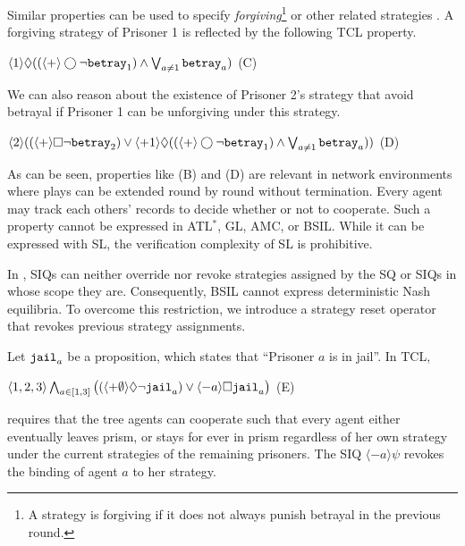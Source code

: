 \documentclass{llncs}
\newcommand{\pfrr}{\Box}
\newcommand{\pevt}{\Diamond}
\newcommand{\nxt}{\bigcirc}
\begin{document}
Similar properties can be used to specify {\em forgiving}\footnote{A strategy 
is forgiving if it does not always punish betrayal in the previous round.} 
or other related strategies \cite{Axelrod80}.  
A forgiving strategy of Prisoner 1 
is reflected by the following TCL property. 
\begin{center} 
\hfill 
$\langle 1\rangle \pevt ((\langle+\rangle \nxt \neg\mbox{\tt betray}_1)
\wedge \bigvee_{a\neq 1}\mbox{\tt betray}_a)$
\hfill (C) 
\end{center} 
We can also reason about the existence of Prisoner 2's strategy 
that avoid betrayal if Prisoner 1 can be unforgiving under this strategy. 
\begin{center} 
\hfill 
$\langle 2\rangle (
(\langle+\rangle \pfrr \neg\mbox{\tt betray}_2) 
\vee \langle +1\rangle\pevt ((\langle+\rangle \nxt \neg\mbox{\tt betray}_1)
\wedge \bigvee_{a\neq 1}\mbox{\tt betray}_a))$
\hfill (D) 
\end{center} 
As can be seen, properties like (B) and (D) are relevant in network environments
where plays can be extended round by round
without termination.  
Every agent may track each others' records to decide whether or not to cooperate. 
Such a property cannot be expressed in ATL$^*$, GL, AMC, or BSIL. 
While it can be expressed with SL, the verification complexity of SL is prohibitive.  

In \cite{WHY11}, SIQs can neither override nor revoke strategies assigned by the SQ or SIQs in whose scope they are.
Consequently, BSIL cannot express deterministic Nash equilibria.
To overcome this restriction, we introduce a strategy reset operator that revokes previous strategy assignments.

Let $\mbox{\tt jail}_a$ be a proposition, which states that ``Prisoner $a$ is in jail''.
In TCL,
\begin{center}
\hfill
$\langle 1,2,3\rangle
        \bigwedge_{a\in [1,3]}\big((
        \langle+\emptyset\rangle\pevt \neg \mbox{\tt jail}_a) \vee
        \langle-a\rangle \pfrr \mbox{\tt jail}_a\big)$
\hfill (E)
\end{center}
requires that the tree agents can cooperate such that every agent either eventually leaves prism, or stays for ever in prism regardless of her own strategy under the current strategies of the remaining prisoners.
The SIQ $\langle-a\rangle\psi$ revokes the binding of agent $a$ to her strategy.
\end{document}
